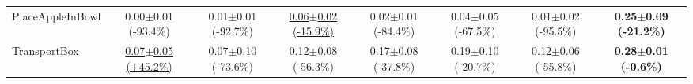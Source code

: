 \begin{table}[htbp]
\begin{adjustbox}{max width=\textwidth}
\begin{tabular}{l*{7}{c}}
PlaceAppleInBowl & 0.00$\pm$0.01 \scriptsize{(-93.4\%)} & 0.01$\pm$0.01 \scriptsize{(-92.7\%)} & \underline{0.06$\pm$0.02 \scriptsize{(-15.9\%)}} & 0.02$\pm$0.01 \scriptsize{(-84.4\%)} & 0.04$\pm$0.05 \scriptsize{(-67.5\%)} & 0.01$\pm$0.02 \scriptsize{(-95.5\%)} & \textbf{0.25$\pm$0.09 \scriptsize{(-21.2\%)}} \\
TransportBox & \underline{0.07$\pm$0.05 \scriptsize{(+45.2\%)}} & 0.07$\pm$0.10 \scriptsize{(-73.6\%)} & 0.12$\pm$0.08 \scriptsize{(-56.3\%)} & 0.17$\pm$0.08 \scriptsize{(-37.8\%)} & 0.19$\pm$0.10 \scriptsize{(-20.7\%)} & 0.12$\pm$0.06 \scriptsize{(-55.8\%)} & \textbf{0.28$\pm$0.01 \scriptsize{(-0.6\%)}} \\
\bottomrule
\end{tabular}
\end{adjustbox}
\end{table}

